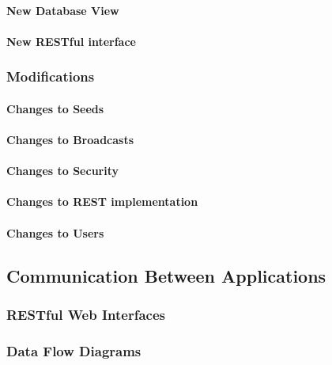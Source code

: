 \documentclass{article}
\begin{document}
\paragraph{New Database View}

\paragraph{New RESTful interface}

\subsubsection{Modifications}

\paragraph{Changes to Seeds}

\paragraph{Changes to Broadcasts}

\paragraph{Changes to Security}

\paragraph{Changes to REST implementation}

\paragraph{Changes to Users}

\subsection{Communication Between Applications}

\subsubsection{RESTful Web Interfaces}

\subsubsection{Data Flow Diagrams}


\newpage
\end{document}
